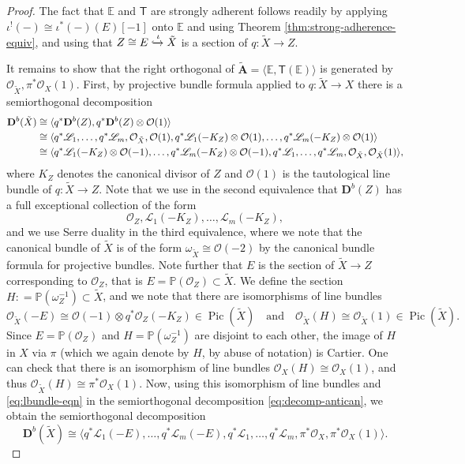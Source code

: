 \documentclass[a4paper,11pt, reqno]{amsart}
\def\E{\mathbb E}
\def\P{\mathbb P}
\def\AA{\mathbf A}
\def\DD{\mathbf D}
\def\OO{\mathcal O}
\def\sL{\mathscr{L}}
\def\Pic{{\operatorname{Pic}}}
\def\Db{\DD^b}
\newcommand{\bT}{\mathsf{T}}
\theoremstyle{plain}
\theoremstyle{definition}
\numberwithin{equation}{section}
\newlength{\arrow}
\begin{document}
\begin{proof}
The fact that $\E$ and $\bT$ are strongly adherent follows readily by applying $\iota^! (-) \cong \iota^\ast(-)(E)[-1]$ onto $\E$ and using Theorem \ref{thm:strong-adherence-equiv}, and using that $Z \cong E \xhookrightarrow{\iota} \tilde{X}$ is a section of $q \colon \tilde{X} \to Z$.

    
    It remains to show that the right orthogonal of $\tilde{\AA} = \langle \E , \bT ( \E ) \rangle $ is generated by $\OO_{\tilde{X}} , \pi^\ast\OO_{X} (1)$.
    First, by projective bundle formula applied to $q\colon \tilde{X} \to X$ there is a semiorthogonal decomposition
    \begin{align}\label{eq:decomp-antican}
        \Db ( \tilde{X} ) & \cong \langle q^\ast \Db(Z) , q^\ast \Db(Z) \otimes \OO(1) \rangle \notag \\
        & \cong \langle  q^\ast \sL_1 , \ldots , q^\ast \sL_m , \OO_{\tilde{X}} , \OO (1) ,  q^\ast \sL_1 ( -K_Z )\otimes \OO(1) , \ldots , q^\ast \sL_m ( -K_Z )\otimes \OO(1) \rangle \notag \\
        & \cong \langle  q^\ast \sL_1 ( -K_Z ) \otimes \OO(-1) , \ldots , q^\ast \sL_m ( -K_Z )\otimes \OO(-1) , q^\ast \sL_1 , \ldots , q^\ast \sL_m , \OO_{\tilde{X}} , \OO_{\tilde{X}} (1) \rangle ,
    \end{align}
where $K_Z$ denotes the canonical divisor of $Z$ and $\OO(1)$ is the tautological line bundle of $q \colon \tilde{X} \to Z$.
Note that we use in the second equivalence that $\Db(Z)$ has a full exceptional collection of the form 
\[
 \OO_Z ,   \sL_1 ( -K_Z ) , \ldots , \sL_m ( -K_Z ) ,
\]
and we use Serre duality in the third equivalence, where we note that the canonical bundle of $\tilde{X}$ is of the form $\omega_{\tilde{X}} \cong \OO(-2)$ by the canonical bundle formula for projective bundles.
Note further that $E$ is the section of $\tilde{X} \to Z $ corresponding to $\OO_Z$, that is $E = \P ( \OO_Z ) \subset \tilde{X}$.
We define the section $H: = \P ( \omega_Z^{-1} ) \subset \tilde{X}$, and we note that 
there are  isomorphisms of line bundles
\begin{equation}\label{eq:lbundle-eqn}
    \OO_{\tilde{X}} (-E ) \cong \OO(-1) \otimes q^\ast \OO_Z ( -K_Z )  \in \Pic ( \tilde{X} )   \quad \text{and} \quad \OO_{\tilde{X}} (H) \cong \OO_{\tilde{X}} (1)\in \Pic ( \tilde{X} ) .
\end{equation}
Since $E = \P( \OO_Z )$ and $H = \P ( \omega_Z^{-1} )$ are disjoint to each other, the image of $H $ in $X$ via $\pi $ (which we again denote by $H$, by abuse of notation) is Cartier.
One can check that there is an isomorphism of line bundles $\OO_X (H) \cong \OO_X (1)$, and thus $\OO_{\tilde{X}} (H) \cong \pi^\ast \OO_X(1)$.
Now, using this isomorphism of line bundles and \eqref{eq:lbundle-eqn}  
in the semiorthogonal decomposition \eqref{eq:decomp-antican}, we obtain the semiorthogonal decomposition
\begin{equation}\label{eq:decomp-antican2}
    \Db ( \tilde{X} ) \cong \langle  q^\ast \sL_1 ( -E ) , \ldots , q^\ast \sL_m ( -E ) , q^\ast \sL_1 , \ldots , q^\ast \sL_m , \pi^\ast\OO_{X} , \pi^\ast\OO_{X} (1) \rangle  .
\end{equation}


\end{proof}
\end{document}
